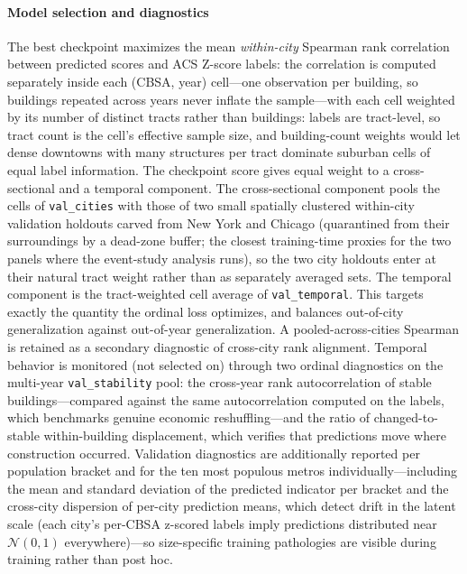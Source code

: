 \documentclass[conference]{IEEEtran}
\begin{document}
\paragraph{Model selection and diagnostics}
The best checkpoint maximizes the mean \emph{within-city} Spearman rank correlation between predicted scores and ACS Z-score labels: the correlation is computed separately inside each (CBSA, year) cell---one observation per building, so buildings repeated across years never inflate the sample---with each cell weighted by its number of distinct tracts rather than buildings: labels are tract-level, so tract count is the cell's effective sample size, and building-count weights would let dense downtowns with many structures per tract dominate suburban cells of equal label information. The checkpoint score gives equal weight to a cross-sectional and a temporal component. The cross-sectional component pools the cells of \texttt{val\_cities} with those of two small spatially clustered within-city validation holdouts carved from New York and Chicago (quarantined from their surroundings by a dead-zone buffer; the closest training-time proxies for the two panels where the event-study analysis runs), so the two city holdouts enter at their natural tract weight rather than as separately averaged sets. The temporal component is the tract-weighted cell average of \texttt{val\_temporal}. This targets exactly the quantity the ordinal loss optimizes, and balances out-of-city generalization against out-of-year generalization. A pooled-across-cities Spearman is retained as a secondary diagnostic of cross-city rank alignment. Temporal behavior is monitored (not selected on) through two ordinal diagnostics on the multi-year \texttt{val\_stability} pool: the cross-year rank autocorrelation of stable buildings---compared against the same autocorrelation computed on the labels, which benchmarks genuine economic reshuffling---and the ratio of changed-to-stable within-building displacement, which verifies that predictions move where construction occurred. Validation diagnostics are additionally reported per population bracket and for the ten most populous metros individually---including the mean and standard deviation of the predicted indicator per bracket and the cross-city dispersion of per-city prediction means, which detect drift in the latent scale (each city's per-CBSA z-scored labels imply predictions distributed near $\mathcal{N}(0,1)$ everywhere)---so size-specific training pathologies are visible during training rather than post hoc.
\end{document}
